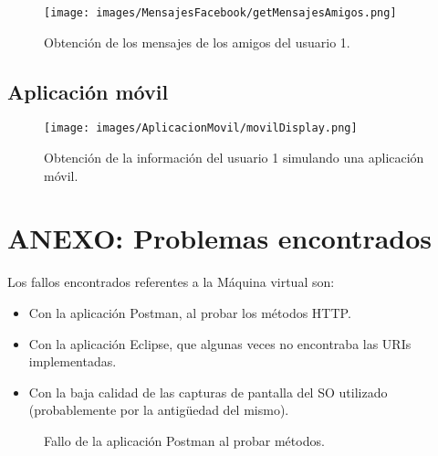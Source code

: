 \documentclass[12pt,a4paper, spanish]{article}
\begin{document}
\begin{figure}[H]
	\centering
	\texttt{[image: images/MensajesFacebook/getMensajesAmigos.png]}
	\caption{Obtención de los mensajes de los amigos del usuario 1.}
\end{figure}

\subsection{Aplicación móvil}
\begin{figure}[H]
	\centering
	\texttt{[image: images/AplicacionMovil/movilDisplay.png]}
	\caption{Obtención de la información del usuario 1 simulando una aplicación móvil.}
\end{figure}
\newpage
\section{ANEXO: Problemas encontrados}

Los fallos encontrados referentes a la Máquina virtual son:

\begin{itemize}
	\item Con la aplicación Postman, al probar los métodos HTTP.
	\item Con la aplicación Eclipse, que algunas veces no encontraba las URIs implementadas.
	\item Con la baja calidad de las capturas de pantalla del SO utilizado (probablemente por la antigüedad del mismo).
\end{itemize} 

\begin{figure}[H]
	\centering
	\caption{Fallo de la aplicación Postman al probar métodos.}
\end{figure}
\end{document}
